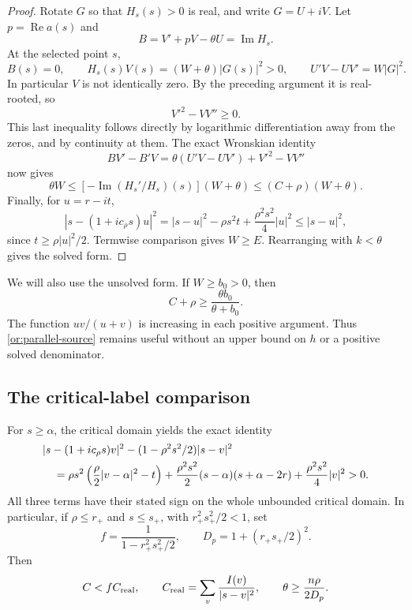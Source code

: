 \documentclass[11pt,reqno]{amsart}
\numberwithin{equation}{section}
\theoremstyle{definition}
\theoremstyle{remark}
\renewcommand{\Re}{\operatorname{Re}}
\renewcommand{\Im}{\operatorname{Im}}
\begin{document}
\begin{proof}
Rotate $G$ so that $H_s(s)>0$ is real, and write $G=U+iV$.  Let
$p=\Re a(s)$ and
\[
                       B=V'+pV-\theta U=\Im H_s.
\]
At the selected point $s$,
\[
 B(s)=0,\qquad H_s(s)V(s)=(W+\theta)|G(s)|^2>0,\qquad
 U'V-UV'=W|G|^2.
\]
In particular $V$ is not identically zero.  By the preceding argument
it is real-rooted, so
\[
 V'^2-VV''\ge0.
\]
This last inequality follows directly by logarithmic differentiation
away from the zeros, and by continuity at them.  The exact Wronskian
identity
\[
 BV'-B'V=\theta(U'V-UV')+V'^2-VV''
\]
now gives
\[
 \theta W\le[-\Im(H_s'/H_s)(s)](W+\theta)
             \le(C+\rho)(W+\theta).
\]
Finally, for $u=r-it$,
\begin{equation}\label{or:denominator-expansion}
 |s-(1+ic_\rho s)u|^2
   =|s-u|^2-\rho s^2t+\frac{\rho^2s^2}{4}|u|^2
   \le |s-u|^2,
\end{equation}
since $t\ge\rho|u|^2/2$.  Termwise comparison gives $W\ge E$.
Rearranging with $k<\theta$ gives the solved form.
\end{proof}

We will also use the unsolved form.  If $W\ge b_0>0$, then
\begin{equation}\label{or:parallel-source}
                   C+\rho\ge\frac{\theta b_0}{\theta+b_0}.
\end{equation}
The function $uv/(u+v)$ is increasing in each positive argument.  Thus
\eqref{or:parallel-source} remains useful without an upper bound on
$h$ or a positive solved denominator.

\subsection{The critical-label comparison}

For $s\ge\alpha$, the critical domain yields the exact identity
\begin{align}
 &|s-(1+ic_\rho s)v|^2
       -(1-\rho^2s^2/2)|s-v|^2\notag\\
 &\quad=\rho s^2\left(\frac\rho2|v-\alpha|^2-t\right)
 +\frac{\rho^2s^2}{2}(s-\alpha)(s+\alpha-2r)
 +\frac{\rho^2s^2}{4}|v|^2>0.\label{or:quadratic-polar}
\end{align}
All three terms have their stated sign on the whole unbounded critical
domain.  In particular, if $\rho\le r_+$ and $s\le s_+$, with
$r_+^2s_+^2/2<1$, set
\begin{equation}\label{or:polar-constants}
 f=\frac1{1-r_+^2s_+^2/2},\qquad
 D_p=1+(r_+s_+/2)^2.
\end{equation}
Then
\[
 C<f C_{\rm real},\qquad
 C_{\rm real}=\sum_v\frac{I(v)}{|s-v|^2},\qquad
 \theta\ge\frac{n\rho}{2D_p}.
\]
\end{document}
